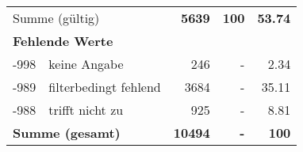 \begin{longtable}{lXrrr}
     \midrule
     \multicolumn{2}{l}{Summe (gültig)} &
       \textbf{\num{5639}} &
     \textbf{100} &
       \textbf{\num[round-mode=places,round-precision=2]{53,74}} \\
     \multicolumn{5}{l}{\textbf{Fehlende Werte}}\\
       -998 &
       keine Angabe &
         \num{246} &
        - &
         \num[round-mode=places,round-precision=2]{2,34} \\
       -989 &
       filterbedingt fehlend &
         \num{3684} &
        - &
         \num[round-mode=places,round-precision=2]{35,11} \\
       -988 &
       trifft nicht zu &
         \num{925} &
        - &
         \num[round-mode=places,round-precision=2]{8,81} \\
     \midrule
     \multicolumn{2}{l}{\textbf{Summe (gesamt)}} &
          \textbf{\num{10494}} &
        \textbf{-} &
        \textbf{100} \\
     \bottomrule
     \end{longtable}
     
